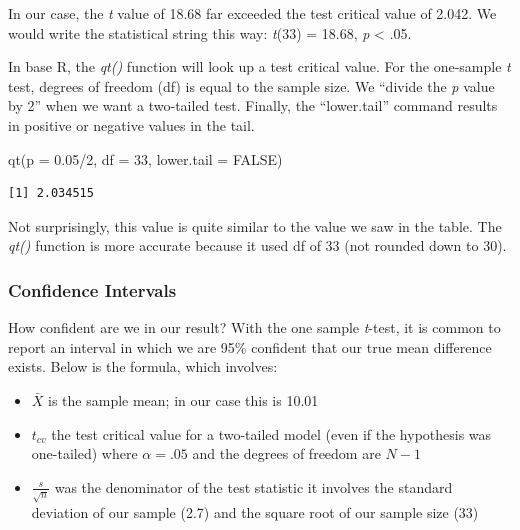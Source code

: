 \documentclass[
  11pt,
]{book}
\newenvironment{Shaded}{\begin{snugshade}}{\end{snugshade}}
\newcommand{\AttributeTok}[1]{\textcolor[rgb]{0.77,0.63,0.00}{#1}}
\newcommand{\ConstantTok}[1]{\textcolor[rgb]{0.00,0.00,0.00}{#1}}
\newcommand{\DecValTok}[1]{\textcolor[rgb]{0.00,0.00,0.81}{#1}}
\newcommand{\FloatTok}[1]{\textcolor[rgb]{0.00,0.00,0.81}{#1}}
\newcommand{\FunctionTok}[1]{\textcolor[rgb]{0.00,0.00,0.00}{#1}}
\newcommand{\NormalTok}[1]{#1}
\newcommand{\SpecialCharTok}[1]{\textcolor[rgb]{0.00,0.00,0.00}{#1}}
\providecommand{\tightlist}{%
  \setlength{\itemsep}{0pt}\setlength{\parskip}{0pt}}
\begin{document}
In our case, the \emph{t} value of 18.68 far exceeded the test critical value of 2.042. We would write the statistical string this way: \emph{t}(33) = 18.68, \emph{p} \textless{} .05.

In base R, the \emph{qt()} function will look up a test critical value. For the one-sample \emph{t} test, degrees of freedom (df) is equal to the sample size. We ``divide the \emph{p} value by 2'' when we want a two-tailed test. Finally, the ``lower.tail'' command results in positive or negative values in the tail.

\begin{Shaded}
\begin{Highlighting}[]
\FunctionTok{qt}\NormalTok{(}\AttributeTok{p =} \FloatTok{0.05}\SpecialCharTok{/}\DecValTok{2}\NormalTok{, }\AttributeTok{df =} \DecValTok{33}\NormalTok{, }\AttributeTok{lower.tail =} \ConstantTok{FALSE}\NormalTok{)}
\end{Highlighting}
\end{Shaded}

\begin{verbatim}
[1] 2.034515
\end{verbatim}

Not surprisingly, this value is quite similar to the value we saw in the table. The \emph{qt()} function is more accurate because it used df of 33 (not rounded down to 30).

\hypertarget{confidence-intervals}{%
\subsubsection{Confidence Intervals}\label{confidence-intervals}}

How confident are we in our result? With the one sample \emph{t}-test, it is common to report an interval in which we are 95\% confident that our true mean difference exists. Below is the formula, which involves:

\begin{itemize}
\tightlist
\item
  \(\bar{X}\) is the sample mean; in our case this is 10.01
\item
  \(t_{cv}\) the test critical value for a two-tailed model (even if the hypothesis was one-tailed) where \(\alpha = .05\) and the degrees of freedom are \(N-1\)
\item
  \(\frac{s}{\sqrt{n}}\) was the denominator of the test statistic it involves the standard deviation of our sample (2.7) and the square root of our sample size (33)
\end{itemize}
\end{document}
